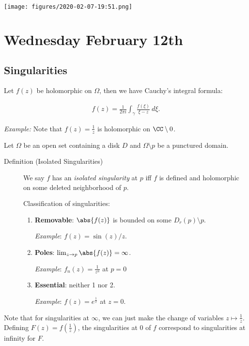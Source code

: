 \texttt{[image: figures/2020-02-07-19:51.png]}\\

\hypertarget{wednesday-february-12th}{%
\section{Wednesday February 12th}\label{wednesday-february-12th}}

\hypertarget{singularities}{%
\subsection{Singularities}\label{singularities}}

Let \(f(z)\) be holomorphic on \(\Omega\), then we have Cauchy's
integral formula:

\begin{align*}
f(z) = \frac{1}{2\pi i} \int_\gamma \frac{f(\xi)}{\xi - z} ~d\xi
.\end{align*}

\emph{Example:} Note that \(f(z) = \frac 1 z\) is holomorphic on
\(\CC\setminus 0\).

Let \(\Omega\) be an open set containing a disk \(D\) and
\(\Omega\setminus p\) be a punctured domain.

\begin{description}
\item[Definition (Isolated Singularities)]
We say \(f\) has an \emph{isolated singularity} at \(p\) iff \(f\) is
defined and holomorphic on some deleted neighborhood of \(p\).

Classification of singularities:

\begin{enumerate}
\def\labelenumi{\arabic{enumi}.}
\item
  \textbf{Removable}: \(\abs{f(z)}\) is bounded on some
  \(D_r(p) \setminus p\).

  \emph{Example}: \(f(z) = \sin(z)/z\).
\item
  \textbf{Poles}: \(\lim_{z\to p} \abs{f(z)} = \infty\).

  \emph{Example}: \(f_n(z) = \frac{1}{z^n}\) at \(p=0\)
\item
  \textbf{Essential}: neither 1 nor 2.

  \emph{Example}: \(f(z) = e^{\frac 1 z}\) at \(z=0\).
\end{enumerate}
\end{description}

Note that for singularities at \(\infty\), we can just make the change
of variables \(z\mapsto \frac 1 z\). Defining \(F(z) = f(\frac 1 z)\),
the singularities at 0 of \(f\) correspond to singularities at infinity
for \(F\).

